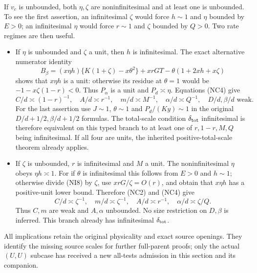 If $v_c$ is unbounded, both $\eta,\zeta$ are noninfinitesimal and
at least one is unbounded. To see the first assertion, an infinitesimal
$\zeta$ would force $h\sim1$ and $\eta$ bounded by $E>0$;
an infinitesimal $\eta$ would force $r\sim1$ and $\zeta$ bounded
by $Q>0$. Two rate regimes are then useful.
\begin{itemize}
\item If $\eta$ is unbounded and $\zeta$ a unit, then $h$ is
infinitesimal. The exact alternative numerator identity
\[
 B_\beta=(x\eta h)\{K(1+\zeta)-x\theta^2\}
             +xrGT-\theta(1+2xh+x\zeta)             \tag{NI8}
\]
shows that $x\eta h$ is a unit: otherwise its residue at
$\theta=1$ would be $-1-x\zeta(1-r)<0$.
Thus $P_\alpha$ is a unit and $P_d\asymp\eta$.
Equations (NC4) give
\[
 C/d\asymp(1-r)^{-1},\quad A/d\asymp r^{-1},\quad
 m/d\asymp M^{-1},\quad\alpha/d\asymp Q^{-1},
 \quad D/d,\beta/d\text{ weak}.                    \tag{NI9}
\]
For the last assertion use $J\sim1$, $\theta\sim1$ and
$P_d/(Ky)\sim1$ in the original $D/d+1/2,\beta/d+1/2$
formulas. The total-scale condition $\delta_{\rm tot}$ infinitesimal
is therefore equivalent on this typed branch to at least one of
$r,1-r,M,Q$ being infinitesimal. If all four are units, the inherited
positive-total-scale theorem already applies.

\item If $\zeta$ is unbounded, $r$ is infinitesimal and $M$ a
unit. The noninfinitesimal $\eta$ obeys $\eta h\asymp1$.
For if $\theta$ is infinitesimal this follows from $E>0$ and
$h\sim1$; otherwise divide (NI8) by $\zeta$, use
$xrG/\zeta=O(r)$, and obtain that $x\eta h$ has a positive-unit
lower bound. Therefore (NC2) and (NC4) give
\[
 C/d\asymp\zeta^{-1},\quad m/d\asymp\zeta^{-1},\quad
 A/d\asymp r^{-1},\quad\alpha/d\asymp\zeta/Q.
 \tag{NI10}
\]
Thus $C,m$ are weak and $A,\alpha$ unbounded. No size restriction
on $D,\beta$ is inferred. This branch already has infinitesimal
$\delta_{\rm tot}$.
\end{itemize}
All implications retain the original physicality and exact source
openings. They identify the missing source scales for further full-parent
proofs; only the actual $(U,U)$ subcase has received a new all-tests
admission in this section and its companion.
